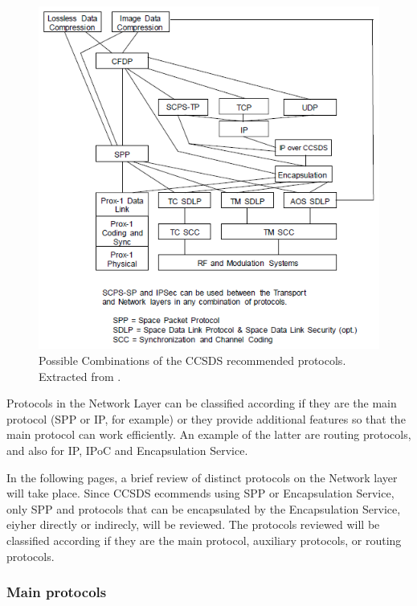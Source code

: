 \begin{figure}[H]
\begin{center}
\includegraphics[scale=1]{CCSDScombinations.PNG}
\caption[Combination of CCSDS Recommended Protocols]{Possible Combinations of the CCSDS recommended protocols. Extracted from \cite{CCSDSOverview}.}
\label{fig:CCSDScombinations}
\end{center}
\end{figure}

Protocols in the Network Layer can be classified according if they are the main protocol (SPP or IP, for example) or they provide additional features so that the main protocol can work efficiently. An example of the latter are routing protocols, and also for IP, IPoC and Encapsulation Service.

In the following pages, a brief review of distinct protocols on the Network layer will take place. Since CCSDS ecommends using SPP or Encapsulation Service, only SPP and protocols that can be encapsulated by the Encapsulation Service, eiyher directly or indirecly, will be reviewed. The protocols reviewed will be classified according if they are the main protocol, auxiliary protocols, or routing protocols.

\subsubsection{Main protocols}

